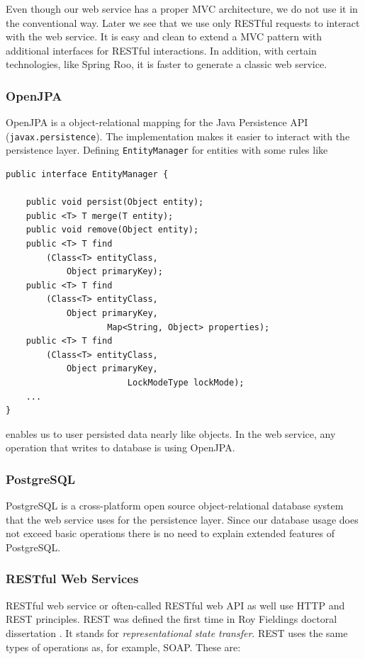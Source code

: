 Even though our web service has a proper MVC architecture, we do not use it in the conventional way. Later we see that we use only RESTful requests to interact with the web service. It is easy and clean to extend a MVC pattern with additional interfaces for RESTful interactions. In addition, with certain technologies, like Spring Roo, it is faster to generate a classic web service.

\subsubsection*{OpenJPA}
OpenJPA is a object-relational mapping for the Java Persistence API (\sloppy \verb^javax.persistence^). The implementation makes it easier to interact with the persistence layer. Defining \verb^EntityManager^ for entities with some rules like

\begin{lstlisting}
public interface EntityManager {

    public void persist(Object entity);
    public <T> T merge(T entity);
    public void remove(Object entity);
    public <T> T find
		(Class<T> entityClass, 
			Object primaryKey);
    public <T> T find
		(Class<T> entityClass, 
			Object primaryKey, 
                	Map<String, Object> properties); 
    public <T> T find
		(Class<T> entityClass, 
			Object primaryKey,
                      	LockModeType lockMode);
	...
}
\end{lstlisting}
enables us to user persisted data nearly like objects. 
In the web service, any operation that writes to database is using OpenJPA.

\subsubsection*{PostgreSQL}
PostgreSQL is a cross-platform open source object-relational database system that the web service uses for the persistence layer. Since our database usage does not exceed basic operations there is no need to explain extended features of PostgreSQL.

\subsubsection*{RESTful Web Services}
RESTful web service or often-called RESTful web API as well use HTTP and REST principles. REST was defined the first time in Roy Fieldings doctoral dissertation \cite{fielding2000architectural}. It stands for \emph{representational state transfer}. REST uses the same types of operations as, for example, SOAP. These are:


